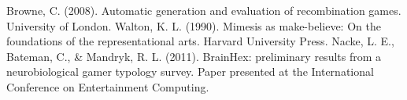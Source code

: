 \documentclass[a4paper,11pt]{article}
\begin{document}
\begin{thebibliography}{99}
        Browne, C. (2008). Automatic generation and evaluation of recombination games. University of London.
        Walton, K. L. (1990). Mimesis as make-believe: On the foundations of the representational arts. Harvard University Press.
        Nacke, L. E., Bateman, C., \& Mandryk, R. L. (2011). BrainHex: preliminary results from a neurobiological gamer typology survey. Paper presented at the International Conference on Entertainment Computing.
      \end{thebibliography}

  
\end{document}
